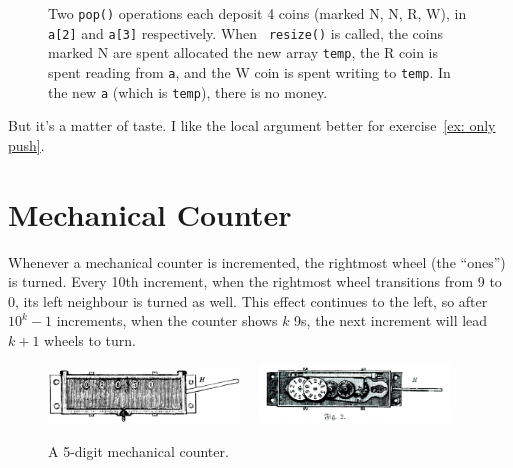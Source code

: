 \documentclass{tufte-handout}
\begin{document}
\begin{figure}
  \caption{ Two {\tt pop()} operations each deposit 4 coins (marked N, N, R,
    W), in {\tt a[2]} and {\tt a[3]} respectively.  When {\tt
      resize()} is called, the coins marked N are spent allocated the
    new array {\tt temp}, the R coin is spent reading from {\tt a},
    and the W coin is spent writing to {\tt temp}. In the new {\tt a}
    (which is {\tt temp}), there is no money.  }
\end{figure}

But it's a matter of taste. I like the local argument better for
exercise~\ref{ex: only push}.


\section{Mechanical Counter}

Whenever a mechanical counter is incremented, the rightmost wheel (the
``ones'') is turned. Every 10th increment, when the rightmost wheel
transitions from 9 to 0, its left neighbour is turned as well. This
effect continues to the left, so after $10^k-1$ increments, when the
counter shows $k$ 9s, the next increment will lead $k+1$ wheels to
turn.

\begin{figure}[htb]
\centerline{\includegraphics[width=2in]{Zaehlwerk_Schema_1.jpg}
$\quad$\includegraphics[width=2in]{Zaehlwerk_Schema_2_clean.jpg}}
\caption{A 5-digit mechanical counter.}
\end{figure}
\end{document}

